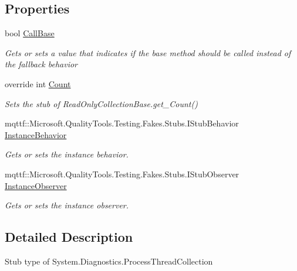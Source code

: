 \subsection*{Properties}
\begin{DoxyCompactItemize}
\item 
bool \hyperlink{class_system_1_1_diagnostics_1_1_fakes_1_1_stub_process_thread_collection_a3dd75d4a75441fb01a6a4ba1e18af509}{Call\-Base}
\begin{DoxyCompactList}\small\item\em Gets or sets a value that indicates if the base method should be called instead of the fallback behavior\end{DoxyCompactList}\item 
override int \hyperlink{class_system_1_1_diagnostics_1_1_fakes_1_1_stub_process_thread_collection_a054e7ed15b6d19928725755079909e65}{Count}
\begin{DoxyCompactList}\small\item\em Sets the stub of Read\-Only\-Collection\-Base.\-get\-\_\-\-Count()\end{DoxyCompactList}\item 
mqttf\-::\-Microsoft.\-Quality\-Tools.\-Testing.\-Fakes.\-Stubs.\-I\-Stub\-Behavior \hyperlink{class_system_1_1_diagnostics_1_1_fakes_1_1_stub_process_thread_collection_ac6ccdd690d1ec23c4fb1fafa9b01dcce}{Instance\-Behavior}
\begin{DoxyCompactList}\small\item\em Gets or sets the instance behavior.\end{DoxyCompactList}\item 
mqttf\-::\-Microsoft.\-Quality\-Tools.\-Testing.\-Fakes.\-Stubs.\-I\-Stub\-Observer \hyperlink{class_system_1_1_diagnostics_1_1_fakes_1_1_stub_process_thread_collection_a81d427730021838f3ad63c71237b4507}{Instance\-Observer}
\begin{DoxyCompactList}\small\item\em Gets or sets the instance observer.\end{DoxyCompactList}\end{DoxyCompactItemize}


\subsection{Detailed Description}
Stub type of System.\-Diagnostics.\-Process\-Thread\-Collection



